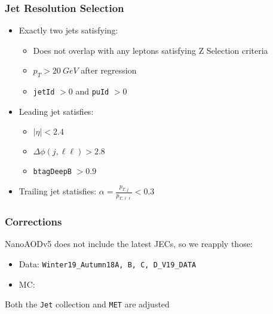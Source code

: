 \documentclass{beamer}
\begin{document}
\begin{frame}
  \frametitle{Jet Resolution Selection}

  \begin{itemize}
  \item Exactly two jets satisfying:
    \begin{itemize}
    \item Does not overlap with any leptons satisfying Z Selection criteria
    \item $p_T > \SI{20}{GeV}$ after regression
    \item \texttt{jetId} $> 0$ and \texttt{puId} $> 0$
    \end{itemize}
  \item Leading jet satisfies:
    \begin{itemize}
    \item $|\eta| < 2.4$
    \item $\Delta\phi(j, \ell\ell) > 2.8$
    \item \texttt{btagDeepB} $> 0.9$
    \end{itemize}
  \item Trailing jet statisfies: $\alpha = \frac{p_{T, j}}{p_{T, \ell\ell}} < 0.3$
  \end{itemize}

\end{frame}


\begin{frame}
  \frametitle{Corrections}

  NanoAODv5 does not include the latest JECs, so we reapply those:

  \begin{itemize}
  \item Data: \texttt{Winter19\_Autumn18{A, B, C, D}\_V19\_DATA}
  \item MC: 
  \end{itemize}

  Both the \texttt{Jet} collection and \texttt{MET} are adjusted

\end{frame}
\end{document}
